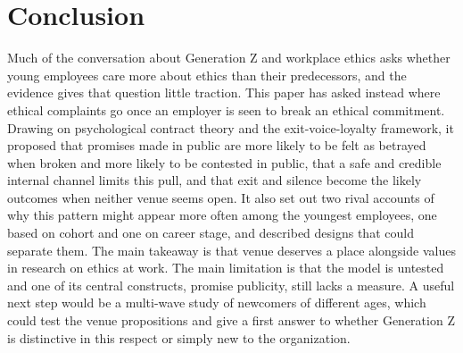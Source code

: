 \documentclass[12pt,a4paper]{article}
\theoremstyle{definition}
\begin{document}
\section{Conclusion}
Much of the conversation about Generation Z and workplace ethics asks whether young employees care more about ethics than their predecessors, and the evidence gives that question little traction. This paper has asked instead where ethical complaints go once an employer is seen to break an ethical commitment. Drawing on psychological contract theory and the exit-voice-loyalty framework, it proposed that promises made in public are more likely to be felt as betrayed when broken and more likely to be contested in public, that a safe and credible internal channel limits this pull, and that exit and silence become the likely outcomes when neither venue seems open. It also set out two rival accounts of why this pattern might appear more often among the youngest employees, one based on cohort and one on career stage, and described designs that could separate them. The main takeaway is that venue deserves a place alongside values in research on ethics at work. The main limitation is that the model is untested and one of its central constructs, promise publicity, still lacks a measure. A useful next step would be a multi-wave study of newcomers of different ages, which could test the venue propositions and give a first answer to whether Generation Z is distinctive in this respect or simply new to the organization.




\end{document}
